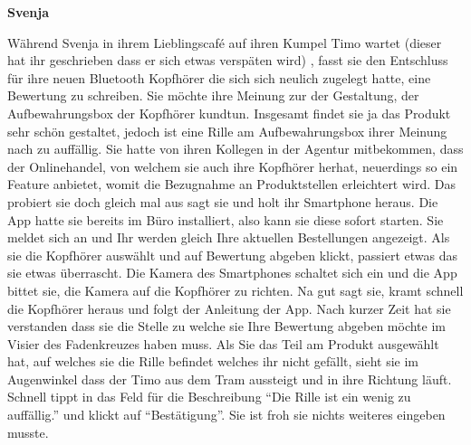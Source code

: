 \vspace{2mm}
\textbf{Svenja}

Während Svenja in ihrem Lieblingscafé auf ihren Kumpel Timo wartet (dieser hat ihr
geschrieben dass er sich etwas verspäten wird) , fasst sie den Entschluss für ihre neuen
Bluetooth Kopfhörer die sich sich neulich zugelegt hatte, eine Bewertung zu schreiben. Sie
möchte ihre Meinung zur der Gestaltung, der Aufbewahrungsbox der Kopfhörer kundtun.
Insgesamt findet sie ja das Produkt sehr schön gestaltet, jedoch ist eine Rille am
Aufbewahrungsbox ihrer Meinung nach zu auffällig. Sie hatte von ihren Kollegen in der
Agentur mitbekommen, dass der Onlinehandel, von welchem sie auch ihre Kopfhörer herhat,
neuerdings so ein Feature anbietet, womit die Bezugnahme an Produktstellen erleichtert
wird.
Das probiert sie doch gleich mal aus sagt sie und holt ihr Smartphone heraus. Die App hatte
sie bereits im Büro installiert, also kann sie diese sofort starten. Sie meldet sich an und Ihr
werden gleich Ihre aktuellen Bestellungen angezeigt. Als sie die Kopfhörer auswählt und auf
Bewertung abgeben klickt, passiert etwas das sie etwas überrascht. Die Kamera des
Smartphones schaltet sich ein und die App bittet sie, die Kamera auf die Kopfhörer zu
richten. Na gut sagt sie, kramt schnell die Kopfhörer heraus und folgt der Anleitung der App.
Nach kurzer Zeit hat sie verstanden dass sie die Stelle zu welche sie Ihre Bewertung
abgeben möchte im Visier des Fadenkreuzes haben muss. Als Sie das Teil am Produkt
ausgewählt hat, auf welches sie die Rille befindet welches ihr nicht gefällt, sieht sie im
Augenwinkel dass der Timo aus dem Tram aussteigt und in ihre Richtung läuft. Schnell tippt
in das Feld für die Beschreibung “Die Rille ist ein wenig zu auffällig.” und klickt auf
“Bestätigung”. Sie ist froh sie nichts weiteres eingeben musste.










